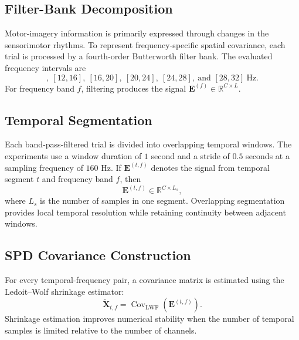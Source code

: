 \subsection{Filter-Bank Decomposition}

Motor-imagery information is primarily expressed through changes in the
sensorimotor rhythms. To represent frequency-specific spatial covariance, each
trial is processed by a fourth-order Butterworth filter bank. The evaluated
frequency intervals are
\begin{equation}
    [8,12],\ [12,16],\ [16,20],\ [20,24],\ [24,28],\
    \text{and }[28,32]\ \mathrm{Hz}.
\end{equation}
For frequency band $f$, filtering produces the signal
$\bm{E}^{(f)} \in \mathbb{R}^{C \times L}$.

\subsection{Temporal Segmentation}

Each band-pass-filtered trial is divided into overlapping temporal windows.
The experiments use a window duration of $1$ second and a stride of $0.5$
seconds at a sampling frequency of $160$ Hz. If $\bm{E}^{(t,f)}$ denotes the
signal from temporal segment $t$ and frequency band $f$, then
\begin{equation}
    \bm{E}^{(t,f)} \in \mathbb{R}^{C \times L_s},
\end{equation}
where $L_s$ is the number of samples in one segment. Overlapping segmentation
provides local temporal resolution while retaining continuity between adjacent
windows.

\subsection{SPD Covariance Construction}

For every temporal-frequency pair, a covariance matrix is estimated using the
Ledoit--Wolf shrinkage estimator:
\begin{equation}
    \widetilde{\bm{X}}_{t,f}
    = \operatorname{Cov}_{\mathrm{LWF}}
      \left(\bm{E}^{(t,f)}\right).
\end{equation}
Shrinkage estimation improves numerical stability when the number of temporal
samples is limited relative to the number of channels.

